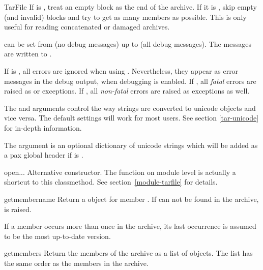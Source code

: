 \begin{classdesc}{TarFile}
    If  is , treat an empty block as the end of
    the archive. If it is , skip empty (and invalid) blocks and try
    to get as many members as possible. This is only useful for reading
    concatenated or damaged archives.

     can be set from  (no debug messages) up to 
    (all debug messages). The messages are written to .

    If  is , all errors are ignored when using
    .  Nevertheless, they appear as error messages in the
    debug output, when debugging is enabled.  If , all \emph{fatal}
    errors are raised as  or  exceptions.
    If , all \emph{non-fatal} errors are raised as 
    exceptions as well.

    The  and  arguments control the way strings are
    converted to unicode objects and vice versa. The default settings will work
    for most users. See section \ref{tar-unicode} for in-depth information.

    The  argument is an optional dictionary of unicode strings
    which will be added as a pax global header if  is
    .
\end{classdesc}

\begin{methoddesc}{open}{...}
    Alternative constructor. The  function on module level is
    actually a shortcut to this classmethod. See section~\ref{module-tarfile}
    for details.
\end{methoddesc}

\begin{methoddesc}{getmember}{name}
    Return a  object for member . If  can
    not be found in the archive,  is raised.
    \begin{notice}
        If a member occurs more than once in the archive, its last
        occurrence is assumed to be the most up-to-date version.
    \end{notice}
\end{methoddesc}

\begin{methoddesc}{getmembers}{}
    Return the members of the archive as a list of  objects.
    The list has the same order as the members in the archive.
\end{methoddesc}

